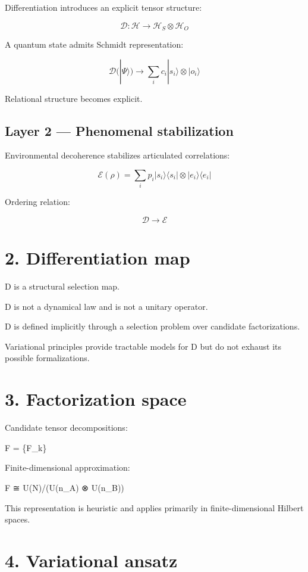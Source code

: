 \documentclass[
]{article}
\begin{document}
Differentiation introduces an explicit tensor structure:

\[
\mathcal D : \mathcal H \to \mathcal H_S \otimes \mathcal H_O
\]

A quantum state admits Schmidt representation:

\[
\mathcal D(|\Psi\rangle) \to \sum_i c_i |s_i\rangle \otimes |o_i\rangle
\]

Relational structure becomes explicit.

\subsection{Layer 2 --- Phenomenal
stabilization}\label{layer-2-phenomenal-stabilization}

Environmental decoherence stabilizes articulated correlations:

\[
\mathcal E(\rho) = \sum_i p_i |s_i\rangle\langle s_i| \otimes |e_i\rangle\langle e_i|
\]

Ordering relation:

\[
\mathcal D \to \mathcal E
\]

\section{2. Differentiation map}\label{differentiation-map}

D is a structural selection map.

D is not a dynamical law and is not a unitary operator.

D is defined implicitly through a selection problem over candidate
factorizations.

Variational principles provide tractable models for D but do not exhaust
its possible formalizations.

\section{3. Factorization space}\label{factorization-space}

Candidate tensor decompositions:

F = \{F\_k\}

Finite-dimensional approximation:

F ≅ U(N)/(U(n\_A) ⊗ U(n\_B))

This representation is heuristic and applies primarily in
finite-dimensional Hilbert spaces.

\section{4. Variational ansatz}\label{variational-ansatz}
\end{document}

